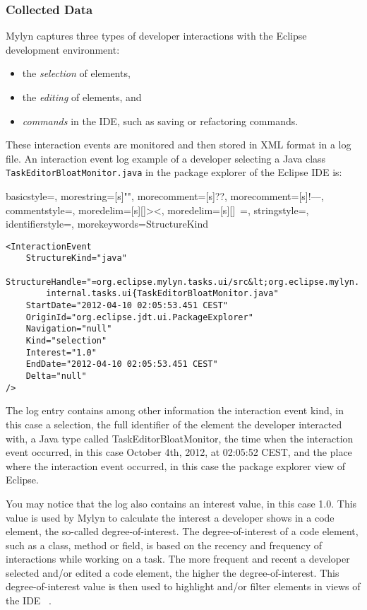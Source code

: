 \subsubsection{Collected Data}
Mylyn captures three types of developer interactions with the Eclipse development environment:
\begin{itemize}
    \item the \textit{selection} of elements,
    \item the \textit{editing} of elements, and
    \item \textit{commands} in the IDE, such as saving or refactoring commands.
\end{itemize}

These interaction events are monitored and then stored in XML format in a log file. An interaction event log example of a developer selecting a Java class \texttt{TaskEditorBloatMonitor.java} in the package explorer of the Eclipse IDE is:

{
  basicstyle=\ttfamily,
  morestring=[s]{"}{"},
  morecomment=[s]{?}{?},
  morecomment=[s]{!--}{--},
  commentstyle=\color{darkgreen},
  moredelim=[s][\color{darkblue}]{>}{<},
  moredelim=[s][\color{red}]{\ }{=},
  stringstyle=\color{blue},
  identifierstyle=\color{maroon},
  morekeywords={StructureKind}
}




\begin{lstlisting}
<InteractionEvent 
    StructureKind="java"
    StructureHandle="=org.eclipse.mylyn.tasks.ui/src&lt;org.eclipse.mylyn.
        internal.tasks.ui{TaskEditorBloatMonitor.java" 
    StartDate="2012-04-10 02:05:53.451 CEST"
    OriginId="org.eclipse.jdt.ui.PackageExplorer" 
    Navigation="null" 
    Kind="selection" 
    Interest="1.0" 
    EndDate="2012-04-10 02:05:53.451 CEST" 
    Delta="null"
/>
\end{lstlisting}

The log entry contains among other information the interaction event kind, in this case a selection, the full identifier of the element the developer interacted with, a Java type called TaskEditorBloatMonitor, the time when the interaction event occurred, in this case October 4th, 2012, at 02:05:52 CEST, and the place where the interaction event occurred, in this case the package explorer view of Eclipse. 

You may notice that the log also contains an interest value, in this case 1.0. This value is used by Mylyn to calculate the interest a developer shows in a code element, the so-called degree-of-interest. The degree-of-interest of a code element, such as a class, method or field, is based on the recency and frequency of interactions while working on a task. The more frequent and recent a developer selected and/or edited a code element, the higher the degree-of-interest. This degree-of-interest value is then used to highlight and/or filter elements in views of the IDE ~.

